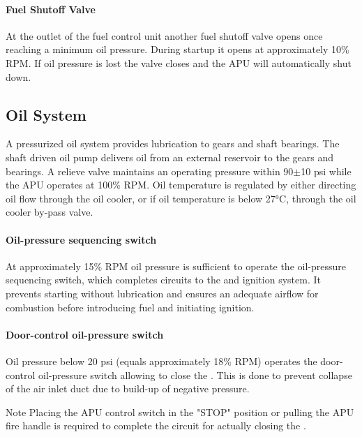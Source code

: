 \paragraph*{Fuel Shutoff Valve}
\label{par:fuel-shutoff-valve}
At the outlet of the fuel control unit another fuel shutoff valve opens once reaching a minimum oil pressure. During startup it opens at approximately 10\% \gls{RPM}. If oil pressure is lost the valve closes and the \gls{APU} will automatically shut down.

\subsection{Oil System}

A pressurized oil system provides lubrication to gears and shaft bearings. The shaft driven oil pump delivers oil from an external reservoir to the gears and bearings. A relieve valve maintains an operating pressure within 90$\pm$10 \gls{psi} while the \gls{APU} operates at 100\% \gls{RPM}. Oil temperature is regulated by either directing oil flow through the oil cooler, or if oil temperature is below 27°C, through the oil cooler by-pass valve.

\paragraph*{Oil-pressure sequencing switch}
At approximately 15\% \gls{RPM} oil pressure is sufficient to operate the oil-pressure sequencing switch, which completes circuits to the  and ignition system. It prevents starting without lubrication and ensures an adequate airflow for combustion before introducing fuel and initiating ignition.

\paragraph*{Door-control oil-pressure switch}
Oil pressure below 20 \gls{psi} (equals approximately 18\% \gls{RPM}) operates the door-control oil-pressure switch allowing to close the . This is done to prevent collapse of the air inlet duct due to build-up of negative pressure.

\begin{bclogo}[logo=\bclampe, ombre=false, couleurBarre=blue, marge=18, noborder=true]{Note}
\indent
Placing the APU control switch in the "STOP" position or pulling the APU fire handle is required to complete the circuit for actually closing the .
\end{bclogo}

